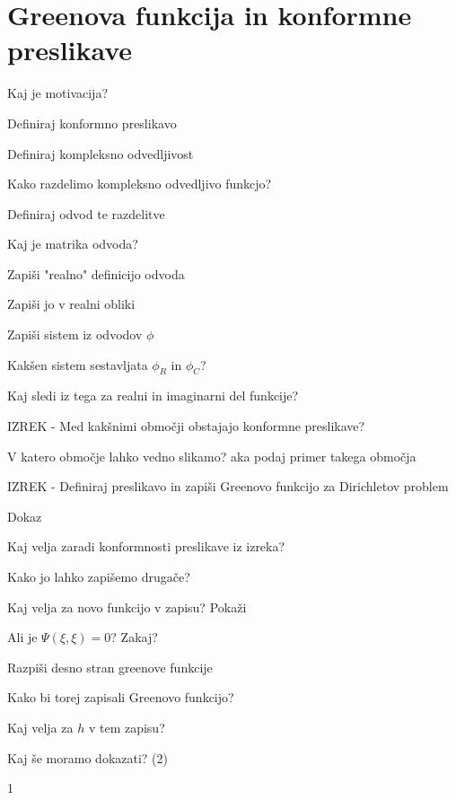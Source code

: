 \documentclass{article}
\begin{document}
    \section{Greenova funkcija in konformne preslikave}
    \begin{enumerate}
        \item Kaj je motivacija?
        {\color{red}\item Definiraj konformno preslikavo}
        {\color{red}\item Definiraj kompleksno odvedljivost}
        \item Kako razdelimo kompleksno odvedljivo funkcjo?
        {\color{red}\item Definiraj odvod te razdelitve}
        \item Kaj je matrika odvoda?
        {\color{red}\item Zapiši "realno" definicijo odvoda}
        {\color{red}\item Zapiši jo v realni obliki}
        {\color{red}\item Zapiši sistem iz odvodov $\phi$}
        {\color{red}\item Kakšen sistem sestavljata $\phi_R$ in $\phi_C$?}
        {\color{red}\item Kaj sledi iz tega za realni in imaginarni del funkcije?}
        {\color{red}\item IZREK - Med kakšnimi območji obstajajo konformne preslikave?}
        \item V katero območje lahko vedno slikamo? aka podaj primer takega območja
        {\color{red}\item IZREK - Definiraj preslikavo in zapiši Greenovo funkcijo za Dirichletov problem}
        Dokaz
        \item Kaj velja zaradi konformnosti preslikave iz izreka?
        {\color{red}\item Kako jo lahko zapišemo drugače?}
        {\color{red}\item Kaj velja za novo funkcijo v zapisu? Pokaži}
        {\color{red}\item Ali je $\Psi(\xi, \xi) = 0$? Zakaj?}
        {\color{red}\item Razpiši desno stran greenove funkcije}
        \item Kako bi torej zapisali Greenovo funkcijo?
        \item Kaj velja za $h$ v tem zapisu? 
        {\color{red}\item Kaj še moramo dokazati? (2)}
        \item 1

\end{enumerate}
\end{document}
